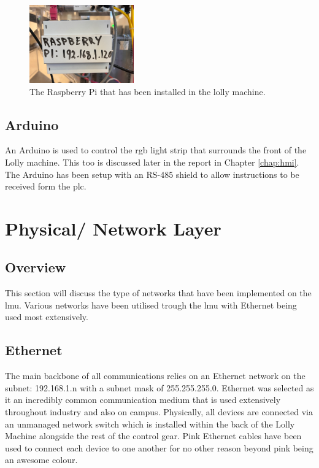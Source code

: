         \begin{figure}[H]
            \centering
            \includegraphics[width = 0.4\textwidth]{2_images/raspPiInstall}
            \caption{The Raspberry Pi that has been installed in the lolly machine.}
            \label{fig:raspPiInstall}
        \end{figure}
    
    
    \subsection{Arduino}
    An Arduino is used to control the \acrshort{rgb} light strip that surrounds
    the front of the Lolly machine. This too is discussed later in the report in Chapter \ref{chap:hmi}. The Arduino has been setup with an RS-485 shield to allow instructions to be received form the \acrshort{plc}.
    
    \section{Physical/ Network Layer}
    
    \subsection{Overview}
    This section will discuss the type of networks that have been implemented on the \acrshort{lmu}. Various networks have been utilised trough the \acrshort{lmu} with Ethernet being used most extensively.
    
    \subsection{Ethernet} 
    The main backbone of all communications relies on an Ethernet network on the subnet: 192.168.1.n with a subnet mask of 255.255.255.0. Ethernet was selected as it an incredibly common communication medium that is used extensively throughout industry and also on campus. Physically, all devices are connected via an unmanaged network switch which is installed within the back of the Lolly Machine alongside the rest of the control gear. Pink Ethernet cables have been used to connect each device to one another for no other reason beyond pink being an awesome colour.
    
